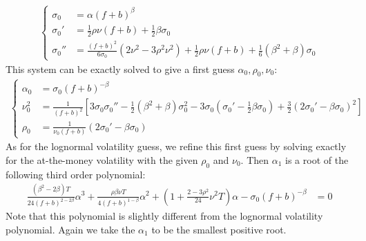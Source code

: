 \documentclass[]{rAMF2e}
\begin{document}
\begin{align}
\begin{cases}
\sigma_0 &= \alpha (f+b)^{\beta}\\
\sigma_0' &= \frac{1}{2}\rho \nu (f+b) + \frac{1}{2} \beta \sigma_0\\
\sigma_0'' &= \frac{(f+b)^2}{6\sigma_0}(2\nu^2 - 3\rho^2\nu^2)+\frac{1}{2} \rho \nu (f+b)+\frac{1}{6}(\beta^2+\beta)\sigma_0
\end{cases}
\end{align}
This system can be exactly solved to give a first guess $\alpha_0, \rho_0,\nu_0$:
\begin{align}
  \begin{cases}
\alpha_0 &=  \sigma_0 (f+b)^{-\beta}\\
\nu_0^2 &= \frac{1}{(f+b)^2}\left[ 3\sigma_0\sigma_0''-\frac{1}{2}(\beta^2+\beta)\sigma_0^2-3\sigma_0(\sigma_0'-\frac{1}{2}\beta\sigma_0) +\frac{3}{2}\left(2\sigma_0'-\beta\sigma_0\right)^2\right] \\
\rho_0 &= \frac{1}{\nu_0 (f+b)}\left(2\sigma_0'-\beta\sigma_0\right) 
\end{cases} 
\end{align}
As for the lognormal volatility guess, we refine this first guess by solving exactly for the at-the-money volatility with the given 
$\rho_0$ and $\nu_0$. Then $\alpha_1$ is a root of the following third order polynomial:
\begin{align}
\frac{(\beta^2-2\beta) T}{24 (f+b)^{2-2\beta}}\alpha^3+ \frac{\rho\beta\nu T}{4(f+b)^{1-\beta}}\alpha^2 + \left(1+\frac{2-3\rho^2}{24}\nu^2 T\right)\alpha - \sigma_0 (f+b)^{-\beta} &= 0
\end{align}
Note that this polynomial is slightly different from the lognormal volatility polynomial. Again we take the $\alpha_1$ to be the smallest positive root.
 
  
%
\end{document}
